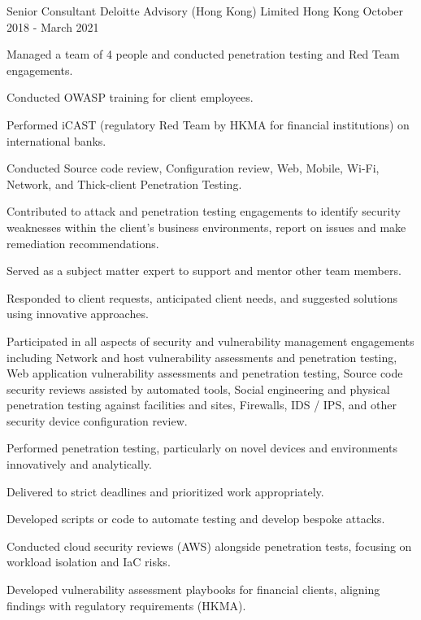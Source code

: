 \begin{cventries}
  \cventry
    {Senior Consultant} %
    {Deloitte Advisory (Hong Kong) Limited} %
    {Hong Kong} %
    {October 2018 - March 2021} %
    {
        \begin{cvitems} %
            \item{Managed a team of 4 people and conducted penetration testing and Red Team engagements.}      
            \item{Conducted OWASP training for client employees.} 
            \item{Performed iCAST (regulatory Red Team by HKMA for financial institutions) on international banks.}
            \item{Conducted Source code review, Configuration review, Web, Mobile, Wi-Fi, Network, and Thick-client Penetration Testing.}
            \item{Contributed to attack and penetration testing engagements to identify security weaknesses within the client's business environments, report on issues and make remediation recommendations.}
            \item{Served as a subject matter expert to support and mentor other team members.}
            \item{Responded to client requests, anticipated client needs, and suggested solutions using innovative approaches.}
            \item{Participated in all aspects of security and vulnerability management engagements including Network and host vulnerability assessments and penetration testing, Web application vulnerability assessments and penetration testing, Source code security reviews assisted by automated tools, Social engineering and physical penetration testing against facilities and sites, Firewalls, IDS / IPS, and other security device configuration review.}
            \item{Performed penetration testing, particularly on novel devices and environments innovatively and analytically.}
            \item{Delivered to strict deadlines and prioritized work appropriately.}
            \item{Developed scripts or code to automate testing and develop bespoke attacks.}
            \item{Conducted cloud security reviews (AWS) alongside penetration tests, focusing on workload isolation and IaC risks.}
            \item{Developed vulnerability assessment playbooks for financial clients, aligning findings with regulatory requirements (HKMA).}
        \end{cvitems}
    }



\end{cventries}
